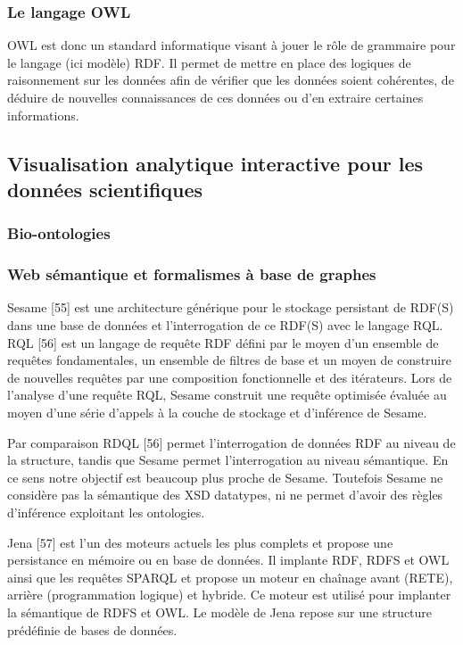 \subsubsection{Le langage OWL}

OWL est donc un standard informatique visant à jouer le rôle de grammaire pour le langage (ici modèle) RDF. Il permet de mettre en place des logiques de raisonnement sur les données afin de vérifier que les données soient cohérentes, de déduire de nouvelles connaissances de ces données ou d'en extraire certaines informations.

\subsection{Visualisation analytique interactive pour les données scientifiques}

\subsubsection{Bio-ontologies}

\cite{schulze-kremer_ontologies_2002}

\subsubsection{Web sémantique et formalismes à base de graphes}

Sesame [55] est une architecture générique pour le stockage persistant de RDF(S) dans une base de données et l'interrogation de ce RDF(S) avec le langage RQL. RQL [56] est un langage de requête RDF défini par le moyen d'un ensemble de requêtes fondamentales, un ensemble de filtres de base et un moyen de construire de nouvelles requêtes par une composition fonctionnelle et des itérateurs. Lors de l'analyse d’une requête RQL, Sesame construit une requête optimisée évaluée au moyen d'une série d'appels à la couche de stockage et d’inférence de Sesame.

Par comparaison RDQL [56] permet l'interrogation de données RDF au niveau de la structure, tandis que Sesame permet l’interrogation au niveau sémantique. En ce sens notre objectif est beaucoup plus proche de Sesame. Toutefois Sesame ne considère pas la sémantique des XSD datatypes, ni ne permet d’avoir des règles d'inférence exploitant les ontologies.

Jena [57] est l’un des moteurs actuels les plus complets et propose une persistance en mémoire ou en base de données. Il implante RDF, RDFS et OWL ainsi que les requêtes SPARQL et propose un moteur en chaînage avant (RETE), arrière (programmation logique) et hybride. Ce moteur est utilisé pour implanter la sémantique de RDFS et OWL. Le modèle de Jena repose sur une structure prédéfinie de bases de données.

